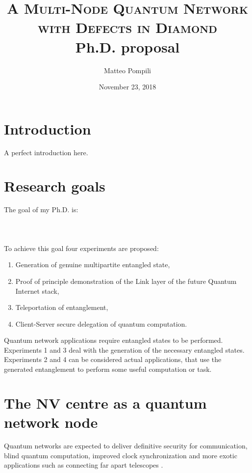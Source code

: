 \documentclass[a4paper, twoside]{article}
\title{
	\huge{\textsc{A Multi-Node Quantum Network\\with Defects in Diamond}}\\
	\vspace{10pt}\Large{Ph.D. proposal}
}
\author{Matteo Pompili}
\date{November 23, 2018}
\begin{document}
\maketitle

\section*{Introduction}
A perfect introduction here.
\blindtext[2]

\setcounter{secnumdepth}{1}
\setcounter{tocdepth}{1}
\tableofcontents

\newpage
\section{Research goals}
The goal of my Ph.D. is:\\\\
\\\\

To achieve this goal four experiments are proposed: 
\begin{enumerate}
	\item Generation of genuine multipartite entangled state,
	\item Proof of principle demonstration of the Link layer of the future Quantum Internet stack,
	\item Teleportation of entanglement,
	\item Client-Server secure delegation of quantum computation.
\end{enumerate}

Quantum network applications require entangled states to be performed. Experiments 1 and 3 deal with the generation of the necessary entangled states. Experiments 2 and 4 can be considered actual applications, that use the generated entanglement to perform some useful computation or task.


\section{The NV centre as a quantum network node}

Quantum networks are expected to deliver definitive security for communication, blind quantum computation, improved clock synchronization and more exotic applications such as connecting far apart telescopes \cite{Wehner2018}.
\end{document}
